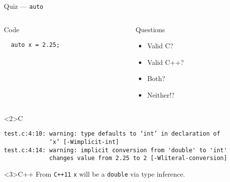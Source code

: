 \documentclass[presentation,aspectratio=169]{beamer}
\begin{document}
\begin{frame}[fragile,label={sec:org23c4234}]{Quiz — \texttt{auto}}
\begin{columns}
\begin{column}{0.48\columnwidth}
\begin{block}{Code}
\begin{verbatim}
  auto x = 2.25;
\end{verbatim}
\end{block}
\end{column}

\begin{column}{0.48\columnwidth}
\begin{block}{Questions}
\begin{itemize}
\item Valid C?
\item Valid C++?
\item Both?
\item Neither!?
\end{itemize}
\end{block}
\end{column}
\end{columns}

\begin{block}<2>{C}
\begin{verbatim}
test.c:4:10: warning: type defaults to ‘int’ in declaration of
             ‘x’ [-Wimplicit-int]
test.c:4:14: warning: implicit conversion from 'double' to 'int'
             changes value from 2.25 to 2 [-Wliteral-conversion]
\end{verbatim}

\end{block}
\vspace{-3cm}
\begin{block}<3>{C++}
From \texttt{C++11} \texttt{x} will be a \texttt{double} via type inference.
\end{block}
\end{frame}

\end{document}
